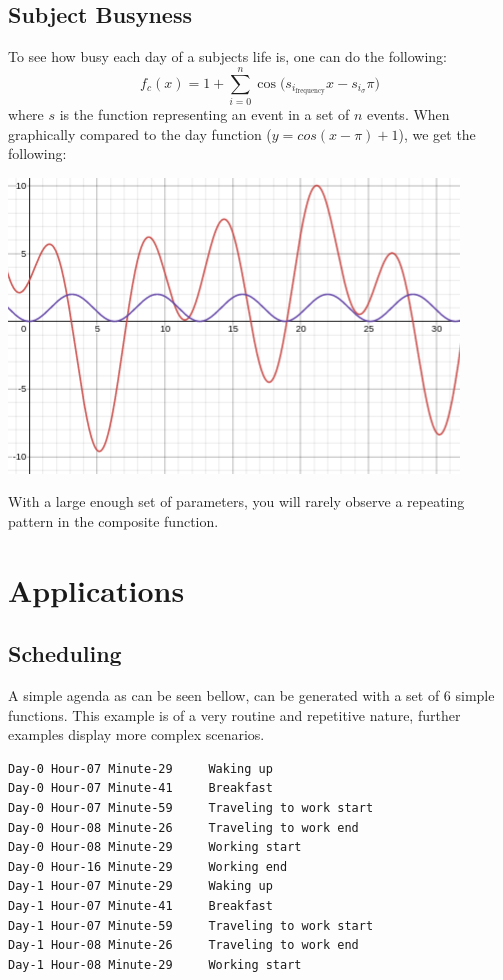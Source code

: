 \documentclass[11pt]{article}
\begin{document}
\subsection{Subject Busyness}
\label{sec:org3ee0737}
To see how busy each day of a subjects life is, one can do the following:
\begin{equation}
    f_c(x) = 1 + \sum_{i=0}^{n}{ \cos(s_i_{\text{frequency}}x - s_i_{\sigma} \pi})
\end{equation}
where \(s\) is the function representing an event in a set of \(n\) events. When graphically compared to the day function (\(y = cos(x - \pi) + 1\)), we get the following:
\begin{center}
\includegraphics[width=.9\linewidth]{./media/activity_density.png}
\end{center}
With a large enough set of parameters, you will rarely observe a repeating pattern in the composite function.
\section{Applications}
\label{sec:org1e8e75b}
\subsection{Scheduling}
\label{sec:org3c99bd5}
A simple agenda as can be seen bellow, can be generated with a set of 6 simple functions. This example is of a very routine and repetitive nature, further examples display more complex scenarios.
\begin{verbatim}
Day-0 Hour-07 Minute-29	 	Waking up
Day-0 Hour-07 Minute-41	 	Breakfast
Day-0 Hour-07 Minute-59	 	Traveling to work start
Day-0 Hour-08 Minute-26	 	Traveling to work end
Day-0 Hour-08 Minute-29	 	Working start
Day-0 Hour-16 Minute-29	 	Working end
Day-1 Hour-07 Minute-29	 	Waking up
Day-1 Hour-07 Minute-41	 	Breakfast
Day-1 Hour-07 Minute-59	 	Traveling to work start
Day-1 Hour-08 Minute-26	 	Traveling to work end
Day-1 Hour-08 Minute-29	 	Working start
\end{verbatim}
\end{document}

